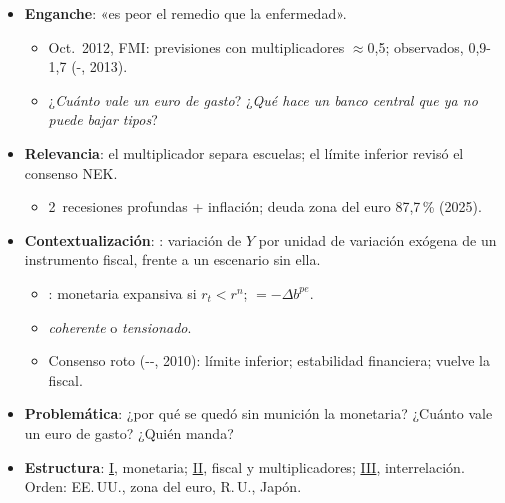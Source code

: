 \documentclass{article}
\begin{document}
\cabecerarepaso
\begin{columnas}

\begin{itemize}
\item \textbf{Enganche}: «es peor el remedio que la enfermedad».
  \begin{itemize}
  \item Oct.\ 2012, FMI: previsiones con multiplicadores $\approx$0,5; observados, 0,9-1,7 (-, 2013).
  \item ¿\emph{Cuánto vale un euro de gasto}? ¿\emph{Qué hace un banco central que ya no puede bajar tipos}?
  \end{itemize}
\item \textbf{Relevancia}: el multiplicador separa escuelas; el límite inferior revisó el consenso NEK.
  \begin{itemize}
  \item 2~recesiones profundas + inflación; deuda zona del euro 87,7\,\% (2025).
  \end{itemize}
\item \textbf{Contextualización}: : variación de $Y$ por unidad de variación exógena de un instrumento fiscal, frente a un escenario sin ella.
  \begin{itemize}
  \item {}: monetaria expansiva si $r_t<r^n$;  $=-\Delta b^{pe}$.
  \item {} \emph{coherente} o \emph{tensionado}.
  \item Consenso roto (--, 2010): límite inferior; estabilidad financiera; vuelve la fiscal.
  \end{itemize}
\item \textbf{Problemática}: ¿por qué se quedó sin munición la monetaria? ¿Cuánto vale un euro de gasto? ¿Quién manda?
\item \textbf{Estructura}: \hyperref[rep:I]{I}, monetaria; \hyperref[rep:II]{II}, fiscal y multiplicadores; \hyperref[rep:III]{III}, interrelación. Orden: EE.\,UU., zona del euro, R.\,U., Japón.
\end{itemize}


\end{columnas}
\end{document}
